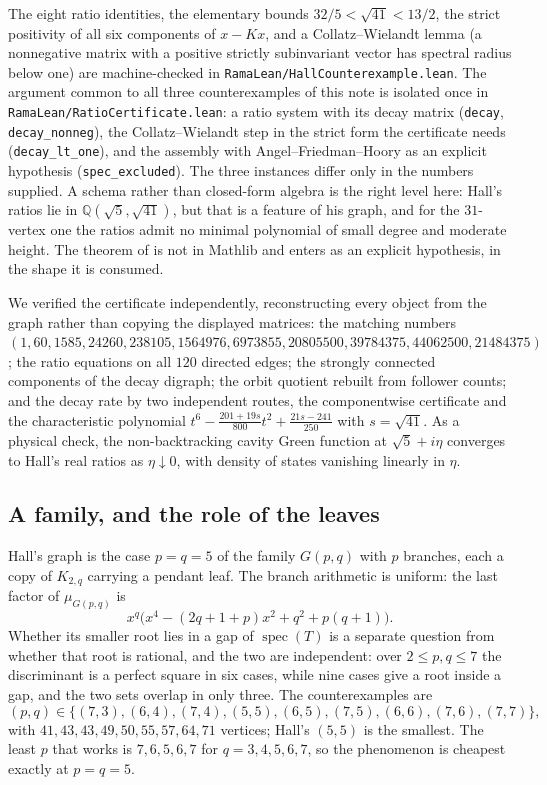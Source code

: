 \documentclass[11pt]{article}
\theoremstyle{remark}
\begin{document}
The eight ratio identities, the elementary bounds $32/5<\sqrt{41}<13/2$, the strict
positivity of all six components of $x-Kx$, and a Collatz--Wielandt lemma (a nonnegative
matrix with a positive strictly subinvariant vector has spectral radius below one) are
machine-checked in \texttt{RamaLean/HallCounterexample.lean}. The argument common to all three
counterexamples of this note is isolated once in
\texttt{RamaLean/RatioCertificate.lean}: a ratio system with its decay matrix
(\texttt{decay}, \texttt{decay\_nonneg}), the Collatz--Wielandt step in the strict form the
certificate needs (\texttt{decay\_lt\_one}), and the assembly with Angel--Friedman--Hoory as an
explicit hypothesis (\texttt{spec\_excluded}). The three instances differ only in the numbers
supplied. A schema rather than closed-form algebra is the right level here: Hall's ratios lie
in $\mathbb{Q}(\sqrt5,\sqrt{41})$, but that is a feature of his graph, and for the $31$-vertex
one the ratios admit no minimal polynomial of small degree and moderate height. The theorem of \cite{AFH} is
not in Mathlib and enters as an explicit hypothesis, in the shape it is consumed.

We verified the certificate independently, reconstructing every object from the graph
rather than copying the displayed matrices: the matching numbers
$(1,60,1585,24260,238105,1564976,6973855,20805500,39784375,44062500,21484375)$; the ratio
equations on all $120$ directed edges; the strongly connected components of the decay
digraph; the orbit quotient rebuilt from follower counts; and the decay rate by two
independent routes, the componentwise certificate and the characteristic polynomial
$t^6-\tfrac{201+19s}{800}t^2+\tfrac{21s-241}{250}$ with $s=\sqrt{41}$. As a physical check,
the non-backtracking cavity Green function at $\sqrt5+i\eta$ converges to Hall's real
ratios as $\eta\downarrow0$, with density of states vanishing linearly in $\eta$.

\subsection{A family, and the role of the leaves}\label{sec:hallfamily}

Hall's graph is the case $p=q=5$ of the family $G(p,q)$ with $p$ branches, each a copy of
$K_{2,q}$ carrying a pendant leaf. The branch arithmetic is uniform: the last factor of
$\mu_{G(p,q)}$ is
\[
   x^{q}\bigl(x^4-(2q+1+p)x^2+q^2+p(q+1)\bigr).
\]
Whether its smaller root lies in a gap of $\operatorname{spec}(T)$ is a separate question
from whether that root is rational, and the two are independent: over $2\le p,q\le7$ the
discriminant is a perfect square in six cases, while nine cases give a root inside a gap,
and the two sets overlap in only three. The counterexamples are
\[
   (p,q)\in\{(7,3),(6,4),(7,4),(5,5),(6,5),(7,5),(6,6),(7,6),(7,7)\},
\]
with $41,43,43,49,50,55,57,64,71$ vertices; Hall's $(5,5)$ is the smallest. The least $p$
that works is $7,6,5,6,7$ for $q=3,4,5,6,7$, so the phenomenon is cheapest exactly at
$p=q=5$.
\end{document}
